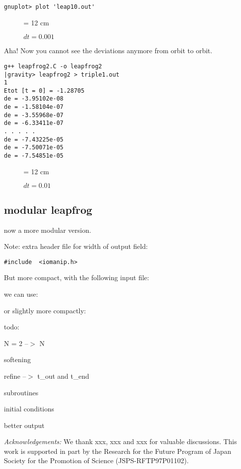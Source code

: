 \begin{verbatim}
gnuplot> plot 'leap10.out'
\end{verbatim}

\begin{figure}
\begin{center}
\leavevmode
\epsfxsize = 12 cm
\caption{$dt = 0.001$}
\label{fig:leap10}
\end{center}
\end{figure}

Aha!  Now you cannot see the deviations anymore from orbit to orbit.



\begin{verbatim}
g++ leapfrog2.C -o leapfrog2
|gravity> leapfrog2 > triple1.out
1
Etot [t = 0] = -1.28705
de = -3.95102e-08
de = -1.58104e-07
de = -3.55968e-07
de = -6.33411e-07
. . . . .
de = -7.43225e-05
de = -7.50071e-05
de = -7.54851e-05
\end{verbatim}

\begin{figure}
\begin{center}
\leavevmode
\epsfxsize = 12 cm
\caption{$dt = 0.01$}
\label{fig:triple1}
\end{center}
\end{figure}

\subsection{modular leapfrog}

now a more modular version.

Note: extra header file for width of output field:

\begin{verbatim}
#include  <iomanip.h>
\end{verbatim}



But more compact, with the following input file:



we can use:



or slightly more compactly:



todo:

N = 2 --$>$ N

softening

refine --$>$ t\_out and t\_end

subroutines

initial conditions

better output



\bigskip

\bigskip

\bigskip

{\it Acknowledgements:}
We thank xxx, xxx and xxx for valuable
discussions.  This work is supported in part by the Research for the
Future Program of Japan Society for the Promotion of Science
(JSPS-RFTP97P01102).


